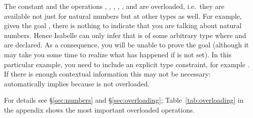 \begin{isabellebody}
\begin{isamarkuptext}
\begin{warn}
  The constant  and the operations
  , ,
  , ,
  ,  and
   are overloaded, i.e.\ they are available
  not just for natural numbers but at other types as well.
  For example, given the goal ,
  there is nothing to indicate that you are talking about natural numbers.
  Hence Isabelle can only infer that  is of some arbitrary type where
   and \isa{{\isacharplus}} are declared. As a consequence, you will be unable
  to prove the goal (although it may take you some time to realize what has
  happened if  is not set).  In this particular example,
  you need to include an explicit type constraint, for example
  . If there is enough contextual information this
  may not be necessary:  automatically implies
   because  is not overloaded.

  For details see \S\ref{sec:numbers} and \S\ref{sec:overloading};
  Table~\ref{tab:overloading} in the appendix shows the most important overloaded
  operations.
\end{warn}


\end{isamarkuptext}
\end{isabellebody}
